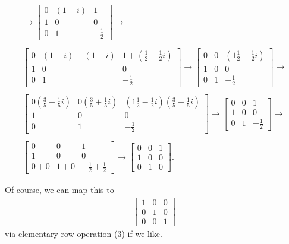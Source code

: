 \documentclass[12pt]{article}
\begin{document}
\begin{enumerate}
\begin{align*}
        \xrightarrow{}
        \begin{bmatrix}
          0 & (1 - i) &  1\\
          1 & 0  &  0\\
          0 & 1 & -\frac{1}{2}
        \end{bmatrix}
        \xrightarrow{}\\\\
        \begin{bmatrix}
          0 & (1 - i) - (1 - i) & 1 + (\frac{1}{2} - \frac{1}{2}i)\\
          1 & 0 & 0\\
          0 & 1 & -\frac{1}{2}
        \end{bmatrix}
        \xrightarrow{}
        \begin{bmatrix}
          0 & 0 & (1\frac{1}{2} - \frac{1}{2}i)\\
          1 & 0 & 0\\
          0 & 1 & -\frac{1}{2}
        \end{bmatrix}
        \xrightarrow{}\\\\
        \begin{bmatrix}
          0(\frac{3}{5} + \frac{1}{5}i) & 0(\frac{3}{5} + \frac{1}{5}i) & (1\frac{1}{2} - \frac{1}{2}i)(\frac{3}{5} + \frac{1}{5}i)\\
          1 & 0 & 0\\
          0 & 1 & -\frac{1}{2}
        \end{bmatrix}
        \xrightarrow{}
        \begin{bmatrix}
          0 & 0 & 1\\
          1 & 0 & 0\\
          0 & 1 & -\frac{1}{2}
        \end{bmatrix}
        \xrightarrow{}\\\\
        \begin{bmatrix}
          0 & 0 & 1\\
          1 & 0 & 0\\
          0 + 0 & 1 + 0 & -\frac{1}{2} + \frac{1}{2}
        \end{bmatrix}
        \xrightarrow{}
        \begin{bmatrix}
          0 & 0 & 1\\
          1 & 0 & 0\\
          0 & 1 & 0
        \end{bmatrix}.
      \end{align*}

      Of course, we can map this to
      \begin{align*}
        \begin{bmatrix}
          1 & 0 & 0\\
          0 & 1 & 0\\
          0 & 0 & 1
        \end{bmatrix}
      \end{align*}
      via elementary row operation (3) if we like.

\end{enumerate}
\end{document}
